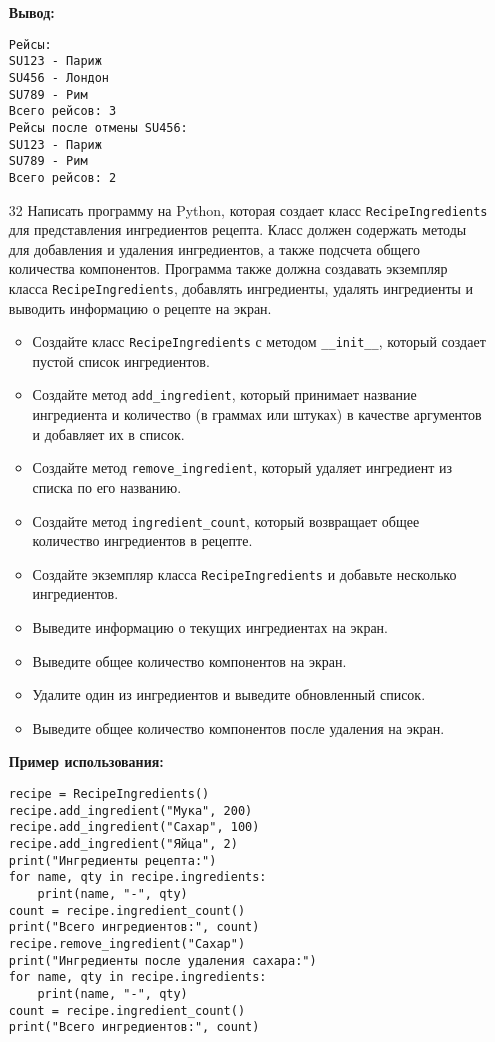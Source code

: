 \begin{enumerate}
\textbf{Вывод:}
\begin{verbatim}
Рейсы:
SU123 - Париж
SU456 - Лондон
SU789 - Рим
Всего рейсов: 3
Рейсы после отмены SU456:
SU123 - Париж
SU789 - Рим
Всего рейсов: 2
\end{verbatim}

\item[32] Написать программу на Python, которая создает класс \texttt{RecipeIngredients} для представления ингредиентов рецепта. Класс должен содержать методы для добавления и удаления ингредиентов, а также подсчета общего количества компонентов. Программа также должна создавать экземпляр класса \texttt{RecipeIngredients}, добавлять ингредиенты, удалять ингредиенты и выводить информацию о рецепте на экран.

\begin{itemize}
    \item Создайте класс \texttt{RecipeIngredients} с методом \texttt{\_\_init\_\_}, который создает пустой список ингредиентов.
    \item Создайте метод \texttt{add\_ingredient}, который принимает название ингредиента и количество (в граммах или штуках) в качестве аргументов и добавляет их в список.
    \item Создайте метод \texttt{remove\_ingredient}, который удаляет ингредиент из списка по его названию.
    \item Создайте метод \texttt{ingredient\_count}, который возвращает общее количество ингредиентов в рецепте.
    \item Создайте экземпляр класса \texttt{RecipeIngredients} и добавьте несколько ингредиентов.
    \item Выведите информацию о текущих ингредиентах на экран.
    \item Выведите общее количество компонентов на экран.
    \item Удалите один из ингредиентов и выведите обновленный список.
    \item Выведите общее количество компонентов после удаления на экран.
\end{itemize}

\textbf{Пример использования:}

\begin{verbatim}
recipe = RecipeIngredients()
recipe.add_ingredient("Мука", 200)
recipe.add_ingredient("Сахар", 100)
recipe.add_ingredient("Яйца", 2)
print("Ингредиенты рецепта:")
for name, qty in recipe.ingredients:
    print(name, "-", qty)
count = recipe.ingredient_count()
print("Всего ингредиентов:", count)
recipe.remove_ingredient("Сахар")
print("Ингредиенты после удаления сахара:")
for name, qty in recipe.ingredients:
    print(name, "-", qty)
count = recipe.ingredient_count()
print("Всего ингредиентов:", count)
\end{verbatim}


\end{enumerate}
